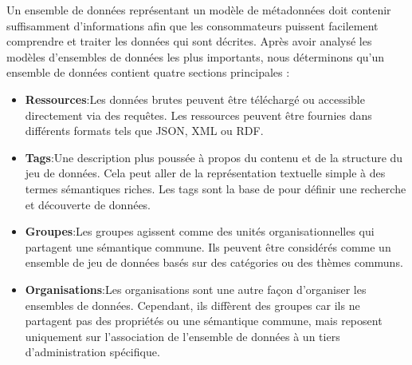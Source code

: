 Un ensemble de donn\'{e}es repr\'{e}sentant un mod\`{e}le de m\'{e}tadonn\'{e}es doit contenir suffisamment d'informations afin que les consommateurs puissent facilement comprendre et traiter les donn\'{e}es qui sont d\'{e}crites. Apr\`{e}s avoir analys\'{e} les mod\`{e}les d'ensembles de donn\'{e}es les plus importants, nous d\'{e}terminons qu'un ensemble de donn\'{e}es contient quatre sections principales :
\begin{itemize}
	\item \textbf{Ressources}:Les donn\'{e}es brutes peuvent être t\'{e}l\'{e}charg\'{e} ou accessible directement via des requêtes. Les ressources peuvent être fournies dans diff\'{e}rents formats tels que JSON, XML ou RDF.
	\item \textbf{Tags}:Une description plus pouss\'{e}e à propos du contenu et de la structure du jeu de donn\'{e}es. Cela peut aller de la repr\'{e}sentation textuelle simple à des termes s\'{e}mantiques riches. Les tags sont la base de pour d\'{e}finir une recherche et d\'{e}couverte de donn\'{e}es.
	\item \textbf{Groupes}:Les groupes agissent comme des unit\'{e}s organisationnelles qui partagent une s\'{e}mantique commune. Ils peuvent être consid\'{e}r\'{e}s comme un ensemble de jeu de donn\'{e}es bas\'{e}s sur des cat\'{e}gories ou des th\`{e}mes communs.
	\item \textbf{Organisations}:Les organisations sont une autre façon d'organiser les ensembles de donn\'{e}es. Cependant, ils diff\`{e}rent des groupes car ils ne partagent pas des propri\'{e}t\'{e}s ou une s\'{e}mantique commune, mais reposent uniquement sur l'association de l'ensemble de donn\'{e}es à un tiers d'administration sp\'{e}cifique.
\end{itemize}

